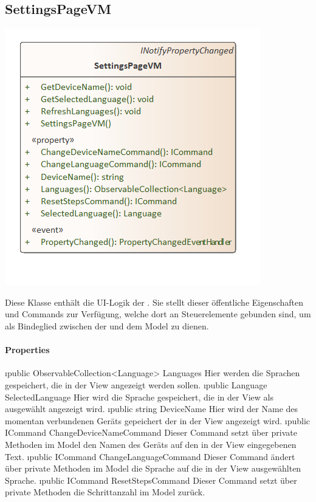 \documentclass[../entwurf.tex]{subfiles}
\begin{document}
\subsection{SettingsPageVM}
\begin{minipage}{0.5\textwidth}
\includegraphics[scale=0.75]{../graphics/vm_klassen/SettingsPageVM.png}
\end{minipage}
\begin{minipage}{0.5\textwidth}
Diese Klasse enthält die UI-Logik der . Sie stellt dieser öffentliche Eigenschaften und Commands zur Verfügung, welche dort an Steuerelemente gebunden sind, um als Bindeglied zwischen der  und dem Model zu dienen.
\end{minipage}
\paragraph{Properties}
\begin{itemize} 
	\i{public ObservableCollection<Language> Languages} Hier werden die Sprachen gespeichert, die in der View angezeigt werden sollen.
	\i{public Language SelectedLanguage} Hier wird die Sprache gespeichert, die in der View als ausgewählt angezeigt wird.
	\i{public string DeviceName} Hier wird der Name des momentan verbundenen Geräts gepeichert der in der View angezeigt wird.
	\i{public ICommand ChangeDeviceNameCommand} Dieser Command setzt über private Methoden im Model den Namen des Geräts auf den in der View eingegebenen Text. 
	\i{public ICommand ChangeLanguageCommand} Dieser Command ändert über private Methoden im Model die Sprache auf die in der View ausgewählten Sprache. 
	\i{public ICommand ResetStepsCommand} Dieser Command setzt über private Methoden die Schrittanzahl im Model zurück. 
\end{itemize}
\end{document}
